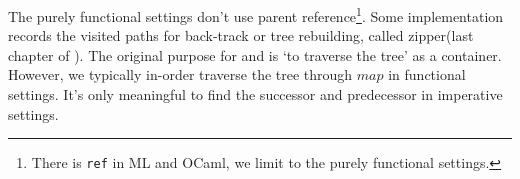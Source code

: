 \documentclass[b5paper]{article}
\begin{document}
The purely functional settings don't use parent reference\footnote{There is \texttt{ref} in ML and OCaml, we limit to the purely functional settings.}. Some implementation records the visited paths for back-track or tree rebuilding, called zipper(last chapter of \cite{learn-haskell}). The original purpose for  and  is `to traverse the tree' as a container. However, we typically in-order traverse the tree through $map$ in functional settings. It's only meaningful to find the successor and predecessor in imperative settings.

\begin{Exercise}\label{ex:bst-lookup}


\end{Exercise}
\end{document}
